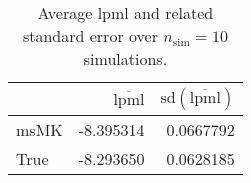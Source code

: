 \begin{table}[H]

\caption{Average lpml and related standard error over $n_{\text{sim}} = 10$ simulations.}
\centering
\begin{tabular}[t]{lrr}
\toprule
  & $\overbar{\text{lpml}}$ & $\text{sd}(\overbar{\text{lpml}})$\\
\midrule
msMK & -8.395314 & 0.0667792\\
True & -8.293650 & 0.0628185\\
\bottomrule
\end{tabular}
\end{table}